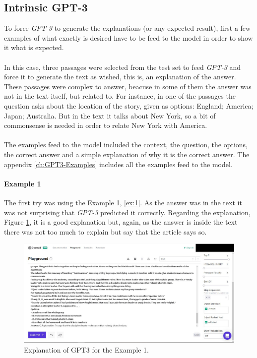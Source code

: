 \cleardoublepage
\subsection{Intrinsic GPT-3}
\label{sec:GPT3Results}
\noindent To force \emph{GPT-3} to generate the explanations (or any expected result), first a few examples of what exactly is desired have to be feed to the model in order to show it what is expected.
\paragraph{}
In this case, three passages were selected from the test set to feed \emph{GPT-3} and force it to generate the text as wished, this is, an explanation of the answer. These passages were complex to answer, beacuse in some of them the answer was not in the text itself, but related to. For instance, in one of the passages the question asks about the location of the story, given as options: England; America; Japan; Australia. But in the text it talks about New York, so a bit of commonsense is needed in order to relate New York with America.
\paragraph{}
The examples feed to the model included the context, the question, the options, the correct answer and a simple explanation of why it is the correct answer. The appendix \ref{ch:GPT3-Examples} includes all the examples feed to the model. 
\paragraph{Example 1}
The first try was using the Example 1, \ref{ex:1}. As the answer was in the text it was not surprising that \emph{GPT-3} predicted it correctly. Regarding the explanation, Figure \ref{fig:gpt3-ex1}, it is a good explanation but, again, as the answer is inside the text there was not too much to explain but say that the article says so.
\begin{figure}[h]
	\centering
	\includegraphics[scale=0.25]{images/gpt3-ex1}
	\caption{Explanation of GPT3 for the Example 1.}
	\label{fig:gpt3-ex1}
\end{figure}
